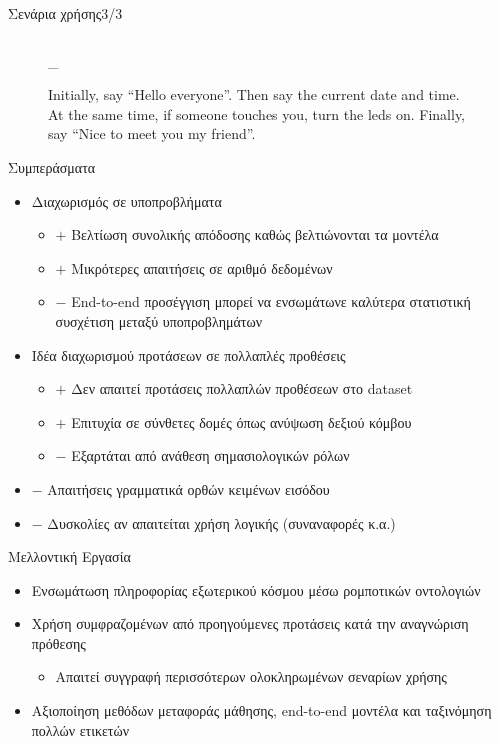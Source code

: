 \documentclass{beamer}
\makeatletter
\newcommand{\escapeunderscore}{\begingroup\@makeother\_\@escapeunderscore}
\newcommand*{\@escapeunderscore}[1]{#1\endgroup}
\makeatother
\begin{document}
{\begin{frame}{Σενάρια χρήσης\hfill{}3/3}
\begin{figure}
\begin{columns}[onlytextwidth]
            \caption{Initially, say ``Hello everyone''.
                Then say the current date and time.
                At the same time, if someone touches you, turn the leds on.
                Finally, say ``Nice to meet you my friend''.}
            \begin{adjustbox}{max width=\textwidth, max height=0.9\textheight}
                \escapeunderscore{}
            \end{adjustbox}
        \end{columns}
    \end{figure}
\end{frame}
}

\newcommand\pro{\item[$+$]}
\newcommand\con{\item[$-$]}
\begin{frame}{Συμπεράσματα}
    \begin{itemize}
        \item Διαχωρισμός σε υποπροβλήματα
              \begin{itemize}
                  \pro Βελτίωση συνολικής απόδοσης καθώς βελτιώνονται τα μοντέλα
                  \pro Μικρότερες απαιτήσεις σε αριθμό δεδομένων
                  \con End-to-end προσέγγιση μπορεί να ενσωμάτωνε καλύτερα στατιστική συσχέτιση μεταξύ υποπροβλημάτων
              \end{itemize}
        \item Ιδέα διαχωρισμού προτάσεων σε πολλαπλές προθέσεις
              \begin{itemize}
                  \pro Δεν απαιτεί προτάσεις πολλαπλών προθέσεων στο dataset
                  \pro Επιτυχία σε σύνθετες δομές όπως ανύψωση δεξιού κόμβου
                  \con Εξαρτάται από ανάθεση σημασιολογικών ρόλων
              \end{itemize}
              \con Απαιτήσεις γραμματικά ορθών κειμένων εισόδου
              \con Δυσκολίες αν απαιτείται χρήση λογικής (συναναφορές κ.α.)
    \end{itemize}
\end{frame}

\begin{frame}{Μελλοντική Εργασία}
    \begin{itemize}
        \item Ενσωμάτωση πληροφορίας εξωτερικού κόσμου μέσω ρομποτικών οντολογιών
        \item Χρήση συμφραζομένων από προηγούμενες προτάσεις κατά την αναγνώριση πρόθεσης
              \begin{itemize}
                  \item Απαιτεί συγγραφή περισσότερων ολοκληρωμένων σεναρίων χρήσης
              \end{itemize}
        \item Αξιοποίηση μεθόδων μεταφοράς μάθησης, end-to-end μοντέλα και ταξινόμηση πολλών ετικετών
    \end{itemize}
\end{frame}
\end{document}
